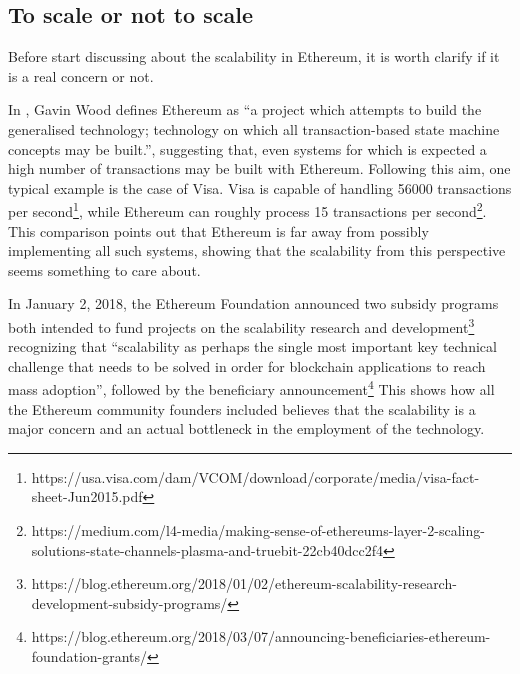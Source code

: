 \subsection{To scale or not to scale}

Before start discussing about the scalability in Ethereum, it is worth clarify
if it is a real concern or not.

In \cite{wood2018ethereum}, Gavin Wood defines Ethereum as ``a project which
attempts to build the generalised technology; technology on which all
transaction-based state machine concepts may be built.'', suggesting that, even
systems for which is expected a high number of transactions may be built with
Ethereum. Following this aim, one typical example is the case of Visa. Visa is
capable of handling 56000 transactions per
second\footnote{https://usa.visa.com/dam/VCOM/download/corporate/media/visa-fact-sheet-Jun2015.pdf},
while Ethereum can roughly process 15 transactions per
second\footnote{https://medium.com/l4-media/making-sense-of-ethereums-layer-2-scaling-solutions-state-channels-plasma-and-truebit-22cb40dcc2f4}.
This comparison points out that Ethereum is far away from possibly implementing
all such systems, showing that the scalability from this perspective seems
something to care about.

In January 2, 2018, the Ethereum Foundation announced two subsidy programs both
intended to fund projects on the scalability research and
development\footnote{https://blog.ethereum.org/2018/01/02/ethereum-scalability-research-development-subsidy-programs/}
recognizing that ``scalability as perhaps the single most important key
technical challenge that needs to be solved in order for blockchain applications
to reach mass adoption'', followed by the beneficiary
announcement\footnote{https://blog.ethereum.org/2018/03/07/announcing-beneficiaries-ethereum-foundation-grants/}
This shows how all the Ethereum community founders included believes that the
scalability is a major concern and an actual bottleneck in the employment of the
technology.
